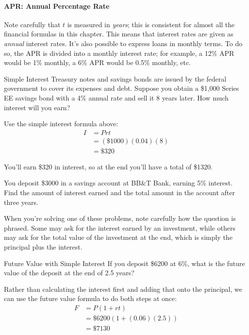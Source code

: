\paragraph{APR: Annual Percentage Rate} Note carefully that $t$ is measured in \textit{years}; this is consistent for almost all the financial formulas in this chapter.  This means that interest rates are given as \textit{annual} interest rates.  It's also possible to express loans in monthly terms.  To do so, the APR is divided into a monthly interest rate; for example, a 12\% APR would be 1\% monthly, a 6\% APR would be 0.5\% monthly, etc.
\vfill

\begin{example}[https://www.youtube.com/watch?v=TJqhAMb2T6Q&list=PLfmpjsIzhztsZtnb7HnXrQ8SLoiOCIcAM&index=13]{Simple Interest}
Treasury notes and savings bonds are issued by the federal government to cover its expenses and debt.
Suppose you obtain a \$1,000 Series EE savings bond with a 4\% annual rate and sell it 8 years later. How much interest will you earn?
\vspace{0.1in}

\sol
Use the simple interest formula above:
\begin{align*}
I &= Prt\\
&= (\$1000)(0.04)(8)\\
&= \boxed{\$320}
\end{align*}

You'll earn \$320 in interest, so at the end you'll have a total of \$1320.
\end{example}
\vfill

\begin{try}
You deposit \$3000 in a savings account at BB\&T Bank, earning 5\% interest.  Find the amount of interest earned and the total amount in the account after three years.
\end{try}

\vfill
When you're solving one of these problems, note carefully how the question is phrased.  Some may ask for the interest earned by an investment, while others may ask for the total value of the investment at the end, which is simply the principal plus the interest.

\vfill
\text{}
\pagebreak
\text{}
\vfill

\begin{example}[https://www.youtube.com/watch?v=T4BcmTGwJCI&list=PLfmpjsIzhztsZtnb7HnXrQ8SLoiOCIcAM&index=14]{Future Value with Simple Interest}
If you deposit \$6200 at 6\%, what is the future value of the deposit at the end of 2.5 years?

\sol
Rather than calculating the interest first and adding that onto the principal, we can use the future value formula to do both steps at once:
\begin{align*}
F &= P(1+rt)\\
&= \$6200(1+(0.06)(2.5))\\
&= \boxed{\$7130}
\end{align*}
\end{example}
\vfill

